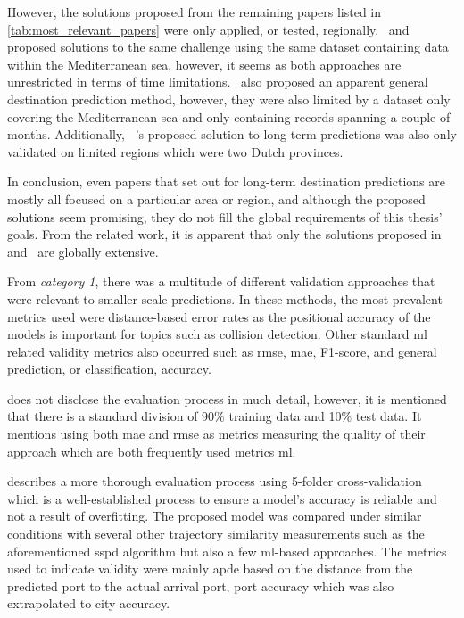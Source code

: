 However, the solutions proposed from the remaining papers listed in \cref{tab:most_relevant_papers} were only applied, or tested, regionally.~\cite{Rosca2018GrandRoutes} and~\cite{Bachar2018GrandDestination} proposed solutions to the same challenge using the same dataset containing data within the Mediterranean sea, however, it seems as both approaches are unrestricted in terms of time limitations.~\cite{Karatas2020TrajectoryData} also proposed an apparent general destination prediction method, however, they were also limited by a dataset only covering the Mediterranean sea and only containing records spanning a couple of months. Additionally, ~\cite{Dobrkovic2018MaritimeData}'s proposed solution to long-term predictions was also only validated on limited regions which were two Dutch provinces.

In conclusion, even papers that set out for long-term destination predictions are mostly all focused on a particular area or region, and although the proposed solutions seem promising, they do not fill the global requirements of this thesis' goals. From the related work, it is apparent that only the solutions proposed in~\cite{lechtenberg2019} and~\cite{Zhang2020AISApproach} are globally extensive.


From \textit{category 1}, there was a multitude of different validation approaches that were relevant to smaller-scale predictions. In these methods, the most prevalent metrics used were distance-based error rates as the positional accuracy of the models is important for topics such as collision detection. Other standard \acrshort{ml} related validity metrics also occurred such as \acrfull{rmse}, \acrfull{mae}, F1-score, and general prediction, or classification, accuracy.

\cite{lechtenberg2019} does not disclose the evaluation process in much detail, however, it is mentioned that there is a standard division of 90\% training data and 10\% test data. It mentions using both \acrshort{mae} and \acrshort{rmse} as metrics measuring the quality of their approach which are both frequently used metrics \acrshort{ml}.

\cite{Zhang2020AISApproach} describes a more thorough evaluation process using 5-folder cross-validation which is a well-established process to ensure a model's accuracy is reliable and not a result of overfitting. The proposed model was compared under similar conditions with several other trajectory similarity measurements such as the aforementioned \acrshort{sspd} algorithm but also a few \acrshort{ml}-based approaches. The metrics used to indicate validity were mainly \acrfull{apde} based on the distance from the predicted port to the actual arrival port, port accuracy which was also extrapolated to city accuracy.

